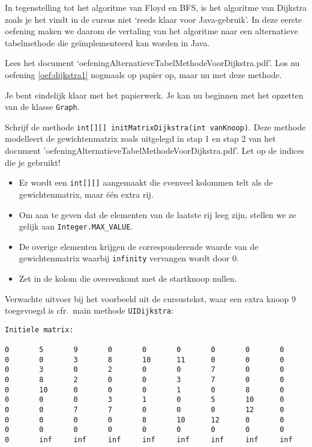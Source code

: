 \begin{oef}
\papier In tegenstelling tot het algoritme van Floyd en BFS, is het algoritme van Dijkstra zoals je het vindt in de cursus niet `reeds klaar voor Java-gebruik'. In deze eerste oefening maken we daarom de vertaling van het algoritme naar een alternatieve tabelmethode die geïmplementeerd kan worden in Java.

Lees het document `oefeningAlternatieveTabelMethodeVoorDijkstra.pdf'. Los nu oefening \ref{oef:dijkstra1} nogmaals op papier op, maar nu met deze methode.
\end{oef}

\begin{oef}
\code Je bent eindelijk klaar met het papierwerk. Je kan nu beginnen met het opzetten van de klasse \verb/Graph/.

Schrijf de methode \verb/int[][] initMatrixDijkstra(int vanKnoop)/. Deze methode modelleert de gewichtenmatrix zoals uitgelegd in stap 1 en stap 2 van het document 'oefeningAlternatieveTabelMethodeVoorDijkstra.pdf'. Let op de indices die je gebruikt!
\begin{itemize}
\item Er wordt een \verb/int[][]/ aangemaakt die evenveel kolommen telt als de gewichtenmatrix, maar één extra rij.
\item Om aan te geven dat de elementen van de laatste rij leeg zijn, stellen we ze gelijk aan \verb/Integer.MAX_VALUE/. 
\item De overige elementen krijgen de corresponderende waarde van de gewichtenmatrix waarbij \verb/infinity/ vervangen wordt door 0.
\item Zet in de kolom die overeenkomt met de startknoop nullen. 
\end{itemize}

Verwachte uitvoer bij het voorbeeld uit de cursustekst, waar een extra knoop $9$ toegevoegd is cfr.\ main methode \verb/UIDijkstra/:
\begin{lstlisting}
Initiele matrix: 

0      	5      	9      	0      	0      	0      	0      	0      	0	
0      	0      	3      	8      	10     	11     	0      	0      	0	
0      	3      	0      	2      	0      	0      	7      	0      	0	
0      	8      	2      	0      	0      	3       7      	0      	0	
0      	10     	0      	0      	0      	1      	0      	8      	0	
0      	0      	0      	3      	1      	0      	5      	10      0	
0      	0      	7      	7      	0      	0      	0      	12     	0	
0      	0      	0       0      	8      	10     	12    	0      	0	
0      	0      	0      	0      	0      	0      	0      	0      	0	
0      	inf    	inf   	inf   	inf   	inf   	inf   	inf   	inf	
\end{lstlisting}
\end{oef}

